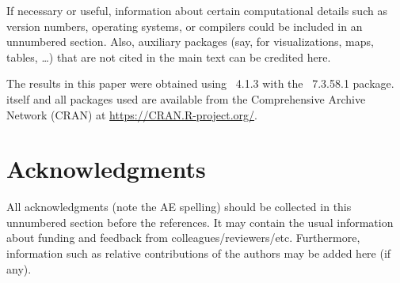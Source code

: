 \documentclass[article]{jss}
\begin{document}
\begin{leftbar}
If necessary or useful, information about certain computational details
such as version numbers, operating systems, or compilers could be included
in an unnumbered section. Also, auxiliary packages (say, for visualizations,
maps, tables, \dots) that are not cited in the main text can be credited here.
\end{leftbar}

The results in this paper were obtained using
~4.1.3 with the
~7.3.58.1 package.  itself
and all packages used are available from the Comprehensive
 Archive Network (CRAN) at
\url{https://CRAN.R-project.org/}.


\section*{Acknowledgments}

\begin{leftbar}
All acknowledgments (note the AE spelling) should be collected in this
unnumbered section before the references. It may contain the usual information
about funding and feedback from colleagues/reviewers/etc. Furthermore,
information such as relative contributions of the authors may be added here
(if any).
\end{leftbar}







\newpage
\end{document}
